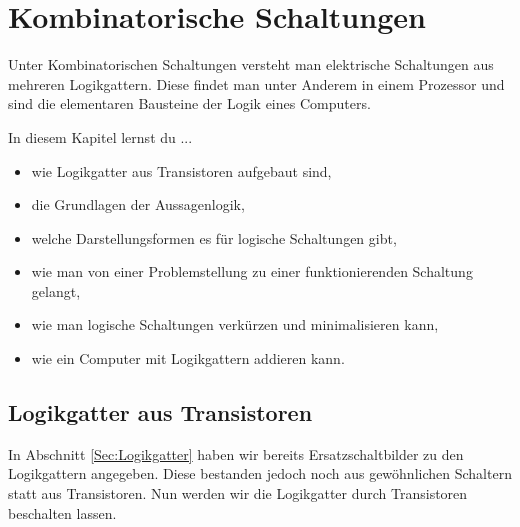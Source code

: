 \chapter{Kombinatorische Schaltungen}

Unter Kombinatorischen Schaltungen versteht man elektrische Schaltungen aus mehreren Logikgattern.
Diese findet man unter Anderem in einem Prozessor und sind die elementaren Bausteine der Logik eines Computers.

\begin{Ziele} 
In diesem Kapitel lernst du ...
\begin{itemize}
\item wie Logikgatter aus Transistoren aufgebaut sind,
\item die Grundlagen der Aussagenlogik,
\item welche Darstellungsformen es für logische Schaltungen gibt,
\item wie man von einer Problemstellung zu einer funktionierenden Schaltung gelangt,
\item wie man logische Schaltungen verkürzen und minimalisieren kann,
\item wie ein Computer mit Logikgattern addieren kann.
\end{itemize}
\end{Ziele}


\section{Logikgatter aus Transistoren}

In Abschnitt \ref{Sec:Logikgatter} haben wir bereits Ersatzschaltbilder zu den Logikgattern angegeben.
Diese bestanden jedoch noch aus gewöhnlichen Schaltern statt aus Transistoren.
Nun werden wir die Logikgatter durch Transistoren beschalten lassen.


